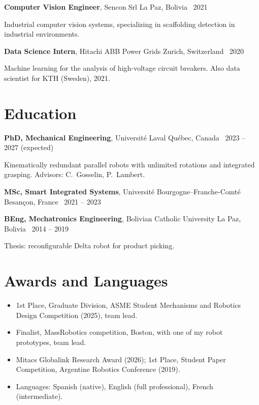 \documentclass[10pt,letterpaper]{article}
\newcommand{\role}[4]{\textbf{#1}, #2 \hfill {\color{muted}#3 \textbar\ #4}\par}
\begin{document}
\vspace{3pt}
\role{Computer Vision Engineer}{Sencon Srl}{La Paz, Bolivia}{2021}
{\small Industrial computer vision systems, specializing in scaffolding detection in industrial environments.}\par\vspace{2pt}
\role{Data Science Intern}{Hitachi ABB Power Grids}{Zurich, Switzerland}{2020}
{\small Machine learning for the analysis of high-voltage circuit breakers. Also data scientist for KTH (Sweden), 2021.}

\section{Education}
\textbf{PhD, Mechanical Engineering}, Universit\'e Laval \hfill {\color{muted}Qu\'ebec, Canada \textbar\ 2023 -- 2027 (expected)}\par
{\small Kinematically redundant parallel robots with unlimited rotations and integrated grasping. Advisors: C.~Gosselin, P.~Lambert.}\par\vspace{2pt}
\textbf{MSc, Smart Integrated Systems}, Universit\'e Bourgogne--Franche-Comt\'e \hfill {\color{muted}Besan\c{c}on, France \textbar\ 2021 -- 2023}\par\vspace{2pt}
\textbf{BEng, Mechatronics Engineering}, Bolivian Catholic University \hfill {\color{muted}La Paz, Bolivia \textbar\ 2014 -- 2019}\par
{\small Thesis: reconfigurable Delta robot for product picking.}

\section{Awards and Languages}
\begin{itemize}
\item 1st Place, Graduate Division, ASME Student Mechanisms and Robotics Design Competition (2025), team lead.
\item Finalist, MassRobotics competition, Boston, with one of my robot prototypes, team lead.
\item Mitacs Globalink Research Award (2026); 1st Place, Student Paper Competition, Argentine Robotics Conference (2019).
\item Languages: Spanish (native), English (full professional), French (intermediate).
\end{itemize}
\end{document}

